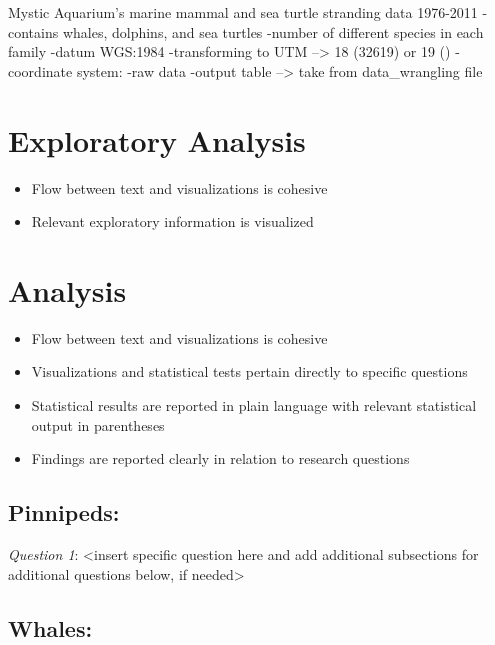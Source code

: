 \documentclass[
  12pt,
]{article}
\providecommand{\tightlist}{%
  \setlength{\itemsep}{0pt}\setlength{\parskip}{0pt}}
\begin{document}
Mystic Aquarium's marine mammal and sea turtle stranding data 1976-2011
-contains whales, dolphins, and sea turtles -number of different species
in each family -datum WGS:1984 -transforming to UTM --\textgreater{} 18
(32619) or 19 () -coordinate system: -raw data -output table
--\textgreater{} take from data\_wrangling file

\newpage

\hypertarget{exploratory-analysis}{%
\section{Exploratory Analysis}\label{exploratory-analysis}}

\begin{itemize}
\tightlist
\item
  Flow between text and visualizations is cohesive
\item
  Relevant exploratory information is visualized
\end{itemize}

\newpage

\hypertarget{analysis}{%
\section{Analysis}\label{analysis}}

\begin{itemize}
\tightlist
\item
  Flow between text and visualizations is cohesive
\item
  Visualizations and statistical tests pertain directly to specific
  questions
\item
  Statistical results are reported in plain language with relevant
  statistical output in parentheses
\item
  Findings are reported clearly in relation to research questions
\end{itemize}

\hypertarget{pinnipeds}{%
\subsection{\texorpdfstring{\textbf{Pinnipeds}:}{Pinnipeds:}}\label{pinnipeds}}

\emph{Question 1}: \textless insert specific question here and add
additional subsections for additional questions below, if
needed\textgreater{}

\hypertarget{whales}{%
\subsection{\texorpdfstring{\textbf{Whales}:}{Whales:}}\label{whales}}
\end{document}
